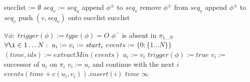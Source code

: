 \documentclass[letterpaper]{article}
\begin{document}
\begin{comment}

\begin{algorithm}
\caption{$MultiAgent A^*HighLevel()$}
\label{alg:update}
\begin{algorithmic}
\STATE $\forall i:\; s_i := start_i$
\WHILE {$g(goal_1, \ldots, goal_N) > f(s_1,\ldots,s_N)$}
\STATE $\forall i:\; expand(s_i)$
\STATE $(s_1,\ldots,s_N) = \arg\min_{s_1,\ldots,s_N} f(s_1,\ldots,s_N)$
\ENDWHILE
\end{algorithmic}
\end{algorithm}

\begin{algorithm}
\caption{$f(s)$}
\label{alg:update}
\begin{algorithmic}
\STATE $f := \infty$
\FORALL {tuples $s_{1\ldots N}\in OPEN$ that include $s$}
\STATE $f := \min(f, jointPriority(s_{1\ldots N}))$
\ENDFOR
\RETURN $f$
\end{algorithmic}
\end{algorithm}

\end{comment}

\begin{algorithm}
\caption{$successors(u, seq_u)$}
\label{alg:update}
\begin{algorithmic}
\STATE succlist := $\emptyset$
\STATE $seq_v := seq_u$
\STATE append $\phi^\pm$ to $seq_v$
\ENDFOR
{}
\STATE remove $\phi^\pm$ from $seq_v$
\STATE append $\phi^\pm$ to $seq_v$
\ENDFOR
\STATE push $(v,seq_v)$ onto succlist
\ENDFOR
\RETURN succlist
\end{algorithmic}
\end{algorithm}

\begin{algorithm}
\caption{$greedyCost(\pi_1,\ldots,\pi_n)$}
\label{alg:update}
\begin{algorithmic}
\STATE $\forall\phi:\; trigger(\phi) := type(\phi) = O$ \OR $\phi^-$ is absent in $\pi_{1\ldots N}$
\STATE $\forall \i\in 1\ldots N:\; u_i := v_i := start_i$
\STATE $events := \{0: \{1\ldots N\}\}$
\STATE $(time, ids) := extractMin(events)$
\STATE $u_i := v_i$
\STATE $trigger(\phi) := true$
\ENDIF
\ENDFOR
\ENDFOR
{}
\STATE $v_i :=$ successor of $u_i$ on $\pi_i$
\STATE $v_i := u_i$ and continue with the next $i$
\ENDIF
\ENDFOR
\STATE $events(time+c(u_i,v_i)).insert(i)$
\ENDFOR
\ENDWHILE
{}
\RETURN $time$
\ELSE
\RETURN $\infty$
\ENDIF
\end{algorithmic}
\end{algorithm}
\end{document}
